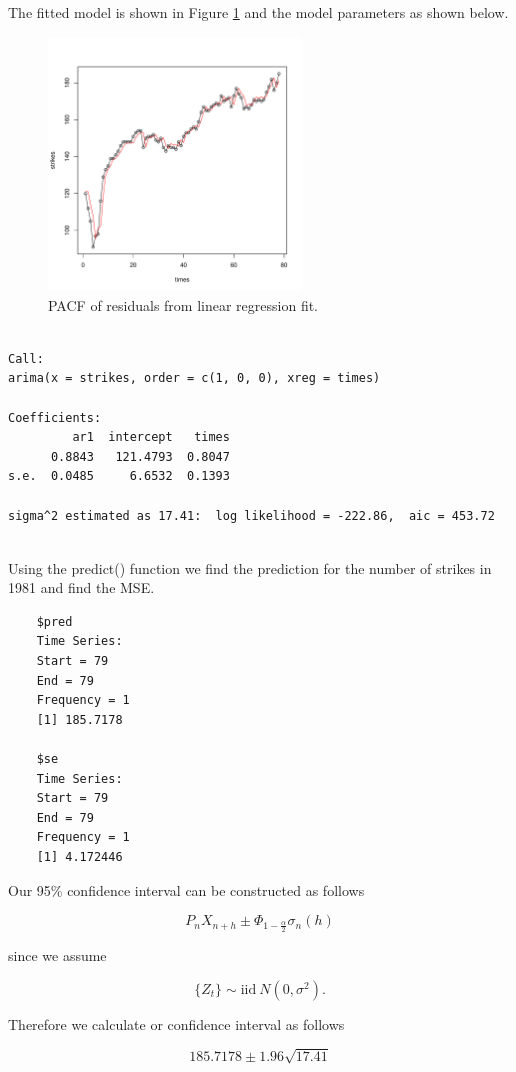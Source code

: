 \documentclass[12pt]{article}
\newenvironment{solution}[2][Solution]{\begin{trivlist}
	\item[\hskip \labelsep {\bfseries #1}]}{\end{trivlist}}
\begin{document}
	\begin{solution}{}
		
	The fitted model is shown in Figure \ref{fig:strikes} and the model parameters as shown below. 
	
	\begin{figure}[H]
    		\centering
    		\includegraphics[width=0.6\textwidth]{figs/problem_6/strikes.pdf}
    		\caption{PACF of residuals from linear regression fit.}
    		\label{fig:strikes}
	\end{figure}
	
	\begin{lstlisting}
	
Call:
arima(x = strikes, order = c(1, 0, 0), xreg = times)

Coefficients:
         ar1  intercept   times
      0.8843   121.4793  0.8047
s.e.  0.0485     6.6532  0.1393

sigma^2 estimated as 17.41:  log likelihood = -222.86,  aic = 453.72
	
	\end{lstlisting}
	
	Using the predict() function we find the prediction for the number of strikes in 1981 and find the MSE. 
	
	\begin{lstlisting}
	$pred
	Time Series:
	Start = 79	
	End = 79
	Frequency = 1
	[1] 185.7178

	$se
	Time Series:
	Start = 79	
	End = 79
	Frequency = 1
	[1] 4.172446
	\end{lstlisting}
		
	Our 95\% confidence interval can be constructed as follows 
	
	\begin{equation*}
	P_nX_{n+h}\pm \Phi_{1-\frac{\alpha}{2}}{\sigma_n(h)}
	\end{equation*}
	
	since we assume
	
	\begin{equation*}
	\{{Z_t}\} \sim \text{iid} \ N(0, \sigma^2).
	\end{equation*}
	
	Therefore we calculate or confidence interval as follows
	
	\begin{equation*}
	185.7178 \pm 1.96 \sqrt{17.41}
	\end{equation*}
			
	\end{solution}
	\pagebreak
	
\end{document}
